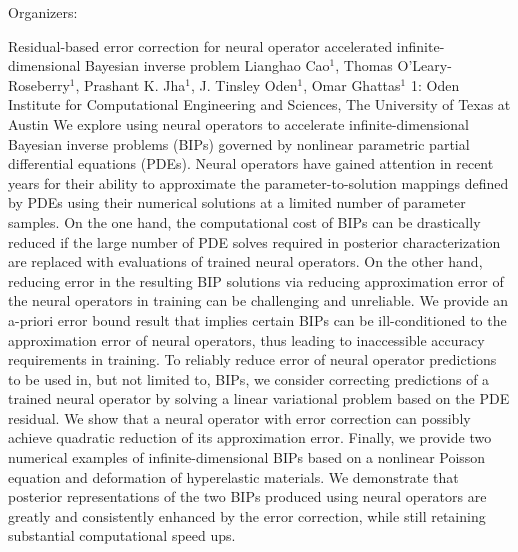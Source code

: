 \label{mini17}

\miniabs
{}
{Organizers: }
{}

\vspace{2ex}
\abs
{Residual-based error correction for neural operator accelerated infinite-dimensional Bayesian inverse problem}
{Lianghao Cao$^1$, Thomas O'Leary-Roseberry$^1$, Prashant K. Jha$^1$, J. Tinsley Oden$^1$, Omar Ghattas$^1$}
{1: Oden Institute for Computational Engineering and Sciences, The University of Texas at Austin}
{We explore using neural operators to accelerate infinite-dimensional Bayesian inverse problems (BIPs) governed by nonlinear parametric partial differential equations (PDEs). Neural operators have gained attention in recent years for their ability to approximate the parameter-to-solution mappings defined by PDEs using their numerical solutions at a limited number of parameter samples. On the one hand, the computational cost of BIPs can be drastically reduced if the large number of PDE solves required in posterior characterization are replaced with evaluations of trained neural operators. On the other hand, reducing error in the resulting BIP solutions via reducing approximation error of the neural operators in training can be challenging and unreliable. We provide an a-priori error bound result that implies certain BIPs can be ill-conditioned to the approximation error of neural operators, thus leading to inaccessible accuracy requirements in training. To reliably reduce error of neural operator predictions to be used in, but not limited to, BIPs, we consider correcting predictions of a trained neural operator by solving a linear variational problem based on the PDE residual. We show that a neural operator with error correction can possibly achieve quadratic reduction of its approximation error. Finally, we provide two numerical examples of infinite-dimensional BIPs based on a nonlinear Poisson equation and deformation of hyperelastic materials. We demonstrate that posterior representations of the two BIPs produced using neural operators are greatly and consistently enhanced by the error correction, while still retaining substantial computational speed ups.}


